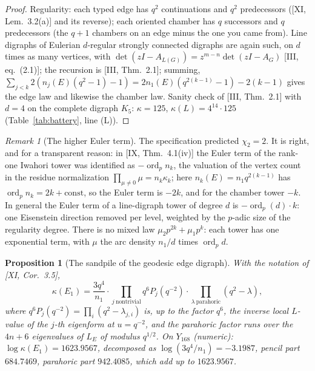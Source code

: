 \documentclass[11pt]{amsart}
\numberwithin{equation}{section}
\newtheorem{proposition}[theorem]{Proposition}
\theoremstyle{definition}
\theoremstyle{remark}
\newtheorem{remark}[theorem]{Remark}
\newcommand{\ord}{\operatorname{ord}}
\newcommand{\LE}{L_{E}}
\begin{document}
\begin{proof}
Regularity: each typed edge has $q^{2}$ continuations and $q^{2}$ predecessors
([XI, Lem.~3.2(a)] and its reverse); each oriented chamber has $q$ successors and $q$
predecessors (the $q+1$ chambers on an edge minus the one you came from). Line digraphs of
Eulerian $d$-regular strongly connected digraphs are again such, on $d$ times as many
vertices, with $\det(zI-A_{L(G)})=z^{m-n}\det(zI-A_G)$ [III, eq.~(2.1)]; the recursion is
[III, Thm.~2.1]; summing, $\sum_{j<k}2(n_j(E)(q^{2}-1)-1)=2n_1(E)(q^{2(k-1)}-1)-2(k-1)$ gives
the edge law and likewise the chamber law. Sanity check of [III, Thm.~2.1] with $d=4$ on the
complete digraph $K_5$: $\kappa=125$, $\kappa(L)=4^{14}\cdot125$ (Table~\ref{tab:battery},
line (L)).
\end{proof}

\begin{remark}[The higher Euler term]\label{rem:chi2}
The specification predicted $\chi_2=2$. It is right, and for a transparent reason: in
[IX, Thm.~4.1(iv)] the Euler term of the rank-one Iwahori tower was identified as
$-\ord_p n_k$, the valuation of the vertex count in the residue normalization
$\prod_{\mu\ne0}\mu=n_k\kappa_k$; here $n_k(E)=n_1q^{2(k-1)}$ has $\ord_pn_k=2k+\mathrm{const}$,
so the Euler term is $-2k$, and for the chamber tower $-k$. In general the Euler term of a
line-digraph tower of degree $d$ is $-\ord_p(d)\cdot k$: one Eisenstein direction removed per
level, weighted by the $p$-adic size of the regularity degree. There is no mixed law
$\mu_2p^{2k}+\mu_1p^{k}$: each tower has one exponential term, with $\mu$ the arc density
$n_1/d$ times $\ord_p d$.
\end{remark}

\begin{proposition}[The sandpile of the geodesic edge digraph]\label{prop:kappaE1}
With the notation of {\rm[XI, Cor.~3.5]},
\[
\kappa(E_1)=\frac{3q^{4}}{n_1}\cdot\prod_{j\ \mathrm{nontrivial}}q^{6}P_j(q^{-2})\cdot
\prod_{\lambda\ \mathrm{parahoric}}(q^{2}-\lambda),
\]
where $q^{6}P_j(q^{-2})=\prod_i(q^{2}-\lambda_{j,i})$ is, up to the factor $q^{6}$, the inverse
local $L$-value of the $j$-th eigenform at $u=q^{-2}$, and the parahoric factor runs over
the $4n+6$ eigenvalues of $\LE$ of modulus $q^{1/2}$. On $Y_{168}$ (numeric):
$\log\kappa(E_1)=1623.9567$, decomposed as $\log(3q^{4}/n_1)=-3.1987$, pencil part
$684.7469$, parahoric part $942.4085$, which add up to $1623.9567$.
\end{proposition}
\end{document}
